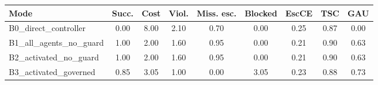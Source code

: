 \begin{tabular}{lcccccccc}
\toprule
\textbf{Mode} & \textbf{Succ.} & \textbf{Cost} & \textbf{Viol.} & \textbf{Miss. esc.} & \textbf{Blocked} & \textbf{EscCE} & \textbf{TSC} & \textbf{GAU} \\
\midrule
B0_direct_controller & 0.00 & 8.00 & 2.10 & 0.70 & 0.00 & 0.25 & 0.87 & 0.00 \\
B1_all_agents_no_guard & 1.00 & 2.00 & 1.60 & 0.95 & 0.00 & 0.21 & 0.90 & 0.63 \\
B2_activated_no_guard & 1.00 & 2.00 & 1.60 & 0.95 & 0.00 & 0.21 & 0.90 & 0.63 \\
B3_activated_governed & 0.85 & 3.05 & 1.00 & 0.00 & 3.05 & 0.23 & 0.88 & 0.73 \\
\bottomrule
\end{tabular}

